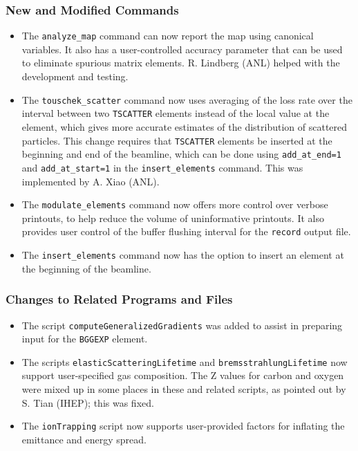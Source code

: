 \documentclass[11pt]{article}
\begin{document}
\subsubsection{New and Modified Commands}
\begin{itemize}
\item The \verb|analyze_map| command can now report the map using canonical variables. It also has a user-controlled accuracy
  parameter that can be used to eliminate spurious matrix elements. R. Lindberg (ANL) helped with the development and testing.
\item The  \verb|touschek_scatter| command  now uses averaging of the loss rate over the interval between two \verb|TSCATTER| elements
  instead of the local value at the element, which gives more accurate estimates of the distribution of scattered particles.
  This change requires that \verb|TSCATTER| elements be inserted at the beginning and end of the beamline, which can be
  done using \verb|add_at_end=1| and \verb|add_at_start=1| in the \verb|insert_elements| command.
  This was implemented by A. Xiao (ANL).
\item The \verb|modulate_elements| command now offers more control over verbose printouts, to help reduce the volume of
  uninformative printouts. It also provides user control of the buffer flushing interval for the \verb|record| output file.
\item The \verb|insert_elements| command now has the option to insert an element at the beginning of the beamline.
\end{itemize}

\subsubsection{Changes to Related Programs and Files}

\begin{itemize}
\item The script \verb|computeGeneralizedGradients| was added to assist in preparing input for the \verb|BGGEXP| element.
\item The scripts \verb|elasticScatteringLifetime| and \verb|bremsstrahlungLifetime| now support user-specified gas composition.
The Z values for carbon and oxygen were mixed up in some places in these and related scripts, as pointed out by S. Tian (IHEP);
this was fixed.
\item The \verb|ionTrapping| script now supports user-provided factors for inflating the emittance and energy spread.
\end{itemize}
\end{document}

